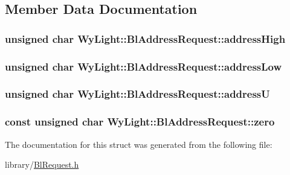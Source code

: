 \subsection{Member Data Documentation}
\hypertarget{struct_wy_light_1_1_bl_address_request_a3e050aa490810811fbe60e04d4cba538}{
\subsubsection[{address\-High}]{\setlength{\rightskip}{0pt plus 5cm}unsigned char Wy\-Light\-::\-Bl\-Address\-Request\-::address\-High}}\label{struct_wy_light_1_1_bl_address_request_a3e050aa490810811fbe60e04d4cba538}
\hypertarget{struct_wy_light_1_1_bl_address_request_a27582cf3b7f0dcd17edd1ea640e0b90e}{
\subsubsection[{address\-Low}]{\setlength{\rightskip}{0pt plus 5cm}unsigned char Wy\-Light\-::\-Bl\-Address\-Request\-::address\-Low}}\label{struct_wy_light_1_1_bl_address_request_a27582cf3b7f0dcd17edd1ea640e0b90e}
\hypertarget{struct_wy_light_1_1_bl_address_request_a1e4b9c78761aba98a236dd9358350a33}{
\subsubsection[{address\-U}]{\setlength{\rightskip}{0pt plus 5cm}unsigned char Wy\-Light\-::\-Bl\-Address\-Request\-::address\-U}}\label{struct_wy_light_1_1_bl_address_request_a1e4b9c78761aba98a236dd9358350a33}
\hypertarget{struct_wy_light_1_1_bl_address_request_a2974213d2ae8d71fb5948e4623d422c9}{
\subsubsection[{zero}]{\setlength{\rightskip}{0pt plus 5cm}const unsigned char Wy\-Light\-::\-Bl\-Address\-Request\-::zero}}\label{struct_wy_light_1_1_bl_address_request_a2974213d2ae8d71fb5948e4623d422c9}


The documentation for this struct was generated from the following file\-:\begin{DoxyCompactItemize}
\item 
library/\hyperlink{_bl_request_8h}{Bl\-Request.\-h}\end{DoxyCompactItemize}
